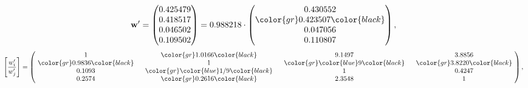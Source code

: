 \begin{example}
\begin{equation*}
\mathbf{w}^{\prime} =
\begin{pmatrix}
0.425479\\
0.418517\\
0.046502\\
0.109502
\end{pmatrix} =
0.988218\cdot
\begin{pmatrix}
0.430552\\
\color{gr} 0.423507\color{black} \\
0.047056\\
0.110807
\end{pmatrix},
\end{equation*}
\begin{equation*}
\left[ \frac{{w}^{\prime}_i}{{w}^{\prime}_j} \right] =
\begin{pmatrix}
$\,\,$ 1 $\,\,$ & $\,\,$\color{gr} 1.0166\color{black} $\,\,$ & $\,\,$9.1497$\,\,$ & $\,\,$3.8856$\,\,$ \\
$\,\,$\color{gr} 0.9836\color{black} $\,\,$ & $\,\,$ 1 $\,\,$ & $\,\,$\color{gr} \color{blue} 9\color{black} $\,\,$ & $\,\,$\color{gr} 3.8220\color{black}   $\,\,$ \\
$\,\,$0.1093$\,\,$ & $\,\,$\color{gr} \color{blue}  1/9\color{black} $\,\,$ & $\,\,$ 1 $\,\,$ & $\,\,$0.4247 $\,\,$ \\
$\,\,$0.2574$\,\,$ & $\,\,$\color{gr} 0.2616\color{black} $\,\,$ & $\,\,$2.3548$\,\,$ & $\,\,$ 1  $\,\,$ \\
\end{pmatrix},
\end{equation*}
\end{example}
\newpage
